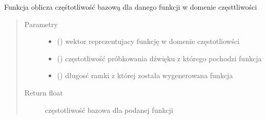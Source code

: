 \documentclass[letterpaper,10pt,polish]{sphinxmanual}
\begin{document}

\begin{fulllineitems}
\label{\detokenize{voice_module:voice_module.get_fundamental_freq}}
Funkcja oblicza częśtotliwość bazową dla danego funkcji w domenie częsttliwości
\begin{quote}\begin{description}
\item[{Parametry}] \leavevmode\begin{itemize}
\item {} 
 () \textendash{} wektor reprezentujacy funkcję w domenie częstotliowści

\item {} 
 () \textendash{} częstotliwość próbkowania dźwięku z którego pochodzi funkcja

\item {} 
 () \textendash{} długosć ramki z której została wygenerowana funkcja

\end{itemize}

\item[{Return float}] \leavevmode
częstotliwość bazowa dla podanej funkcji

\end{description}\end{quote}

\end{fulllineitems}

\end{document}
